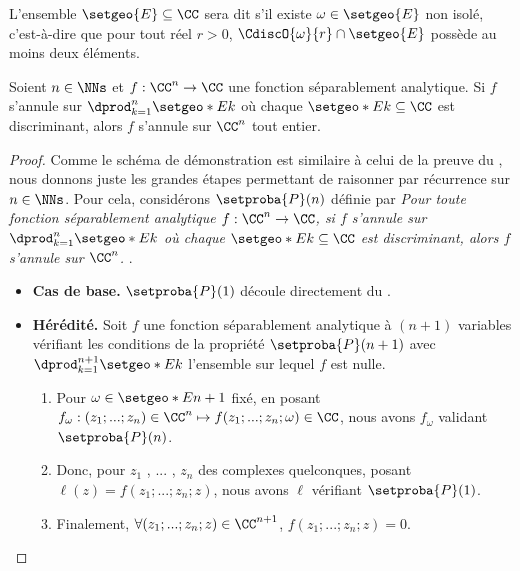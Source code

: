 \begin{defi}
    L'ensemble $\setgeo{E} \subseteq \CC$ sera dit  
    s'il existe $\omega \in \setgeo{E}$ non isolé,
    c'est-à-dire
    que pour tout réel $r > 0$,
    $\CdiscO{\omega}{r} \cap \setgeo{E}$ possède au moins deux éléments.
\end{defi}


\begin{fact} \label{sep-isolated-zero}
    Soient $n \in \NNs$
    et
    $f: \CC^n \rightarrow \CC$ une fonction séparablement analytique.
	Si $f$ s'annule sur $\dprod_{k=1}^{n} \setgeo*{E}{k}$ où chaque $\setgeo*{E}{k} \subseteq \CC$ est discriminant,
	alors $f$ s'annule sur $\CC^n$ tout entier. 
\end{fact}


\begin{proof}
	Comme le schéma de démonstration est similaire à celui de la preuve du ,
	nous donnons juste les grandes étapes permettant de raisonner par récurrence sur $n \in \NNs$.
	Pour cela, considérons $\setproba{P}(n)$ définie par
	\emph{\og 
		Pour toute fonction séparablement analytique $f: \CC^n \rightarrow \CC$,
		si $f$ s'annule sur $\dprod_{k=1}^{n} \setgeo*{E}{k}$ où chaque $\setgeo*{E}{k} \subseteq \CC$ est discriminant,
		alors $f$ s'annule sur $\CC^n$. 
	\fg}\kern2pt.
	\begin{itemize}[label=\small\textbullet]
		\item \textbf{Cas de base.}
		$\setproba{P}(1)$ découle directement du .


		\item \textbf{Hérédité.}
		Soit $f$ une fonction séparablement analytique à $(n + 1)$ variables vérifiant les conditions de la propriété $\setproba{P}(n + 1)$
		avec
		$\dprod_{k=1}^{n+1} \setgeo*{E}{k}$ l'ensemble sur lequel $f$ est nulle.
		
		\vspace{-6pt}
		\begin{enumerate}
		    \item Pour $\omega \in \setgeo*{E}{n+1}$ fixé,
		    en posant
		    $f_\omega: (z_1 ; ... ; z_n) \in \CC^n \mapsto f(z_1 ; ... ; z_n ; \omega) \in \CC$, 
		    nous avons $f_\omega$ validant $\setproba{P}(n)$.


		    \item Donc, pour $z_1$ , ... , $z_n$ des complexes quelconques,
		    posant $\ell(z) = f(z_1 ; ... ; z_n ; z)$,
		    nous avons $\ell$ vérifiant $\setproba{P}(1)$.


		    \item Finalement,
		    $\forall (z_1 ; ... ; z_n ; z) \in  \CC^{n+1}$,
		    $f(z_1 ; ... ; z_n ; z) = 0$.
		\end{enumerate}
	\end{itemize}

	\null\vspace{-6.5ex}
\end{proof}


